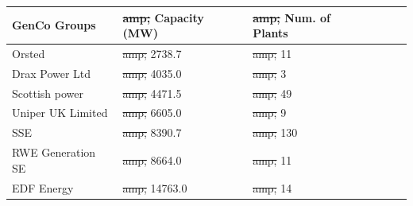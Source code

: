 \documentclass[conference]{IEEEtran}
\providecommand{\DIFdel}[1]{{\protect\color{red}\sout{#1}}}                      %
\providecommand{\DIFdelFL}[1]{\DIFdel{#1}} %
\providecommand{\DIFaddbeginFL}{} %
\providecommand{\DIFaddendFL}{} %
\providecommand{\DIFdelbeginFL}{} %
\providecommand{\DIFdelendFL}{} %
\newcommand{\DIFscaledelfig}{0.5}
\newlength{\DIFdelgraphicswidth} %
\newlength{\DIFdelgraphicsheight} %
\newcommand{\DIFaddincludegraphics}[2][]{{\color{blue}\fbox{\DIFOincludegraphics[#1]{#2}}}} %
\newcommand{\DIFdelincludegraphics}[2][]{%
\sbox{\DIFdelgraphicsbox}{\DIFOincludegraphics[#1]{#2}}%
\settoboxwidth{\DIFdelgraphicswidth}{\DIFdelgraphicsbox} %
\settoboxtotalheight{\DIFdelgraphicsheight}{\DIFdelgraphicsbox} %
\scalebox{\DIFscaledelfig}{%
\parbox[b]{\DIFdelgraphicswidth}{\usebox{\DIFdelgraphicsbox}\\[-\baselineskip] \rule{\DIFdelgraphicswidth}{0em}}\llap{\resizebox{\DIFdelgraphicswidth}{\DIFdelgraphicsheight}{%
\setlength{\unitlength}{\DIFdelgraphicswidth}%
\begin{picture}(1,1)%
\thicklines\linethickness{2pt} %
{\color[rgb]{1,0,0}\put(0,0){\framebox(1,1){}}}%
{\color[rgb]{1,0,0}\put(0,0){\line( 1,1){1}}}%
{\color[rgb]{1,0,0}\put(0,1){\line(1,-1){1}}}%
\end{picture}%
}\hspace*{3pt}}} %
} %
\DeclareRobustCommand{\DIFaddbeginFL}{\DIFOaddbeginFL \let\includegraphics\DIFaddincludegraphics} %
\DeclareRobustCommand{\DIFaddendFL}{\DIFOaddendFL \let\includegraphics\DIFOincludegraphics} %
\DeclareRobustCommand{\DIFdelbeginFL}{\DIFOdelbeginFL \let\includegraphics\DIFdelincludegraphics} %
\DeclareRobustCommand{\DIFdelendFL}{\DIFOaddendFL \let\includegraphics\DIFOincludegraphics} %
\begin{document}
\begin{table}
\DIFdelbeginFL %
\DIFdelendFL \DIFaddbeginFL \renewcommand{\arraystretch}{1.35}
\DIFaddendFL \centering
\begin{tabular}{llllll}
\toprule
GenCo Groups                                                                                                                  & \DIFdelbeginFL \DIFdelFL{amp; }\DIFdelendFL Capacity (MW) & \DIFdelbeginFL \DIFdelFL{amp; }\DIFdelendFL Num. of Plants \\ \midrule
Orsted                                                                                                                       & \DIFdelbeginFL \DIFdelFL{amp; }\DIFdelendFL 2738.7   & \DIFdelbeginFL \DIFdelFL{amp; }\DIFdelendFL 11               \\
Drax Power Ltd                                                                                                               & \DIFdelbeginFL \DIFdelFL{amp; }\DIFdelendFL 4035.0   & \DIFdelbeginFL \DIFdelFL{amp; }\DIFdelendFL 3                \\
Scottish power                                                                                                               & \DIFdelbeginFL \DIFdelFL{amp; }\DIFdelendFL 4471.5   & \DIFdelbeginFL \DIFdelFL{amp; }\DIFdelendFL 49               \\
Uniper UK Limited                                                                                                            & \DIFdelbeginFL \DIFdelFL{amp; }\DIFdelendFL 6605.0   & \DIFdelbeginFL \DIFdelFL{amp; }\DIFdelendFL 9                \\
SSE                                                                                                                          & \DIFdelbeginFL \DIFdelFL{amp; }\DIFdelendFL 8390.7   & \DIFdelbeginFL \DIFdelFL{amp; }\DIFdelendFL 130              \\
RWE Generation SE                                                                                                            & \DIFdelbeginFL \DIFdelFL{amp; }\DIFdelendFL 8664.0   & \DIFdelbeginFL \DIFdelFL{amp; }\DIFdelendFL 11               \\
EDF Energy                                                                                                                   & \DIFdelbeginFL \DIFdelFL{amp; }\DIFdelendFL 14763.0  & \DIFdelbeginFL \DIFdelFL{amp; }\DIFdelendFL 14               \\

\end{tabular}
\end{table}
\end{document}

